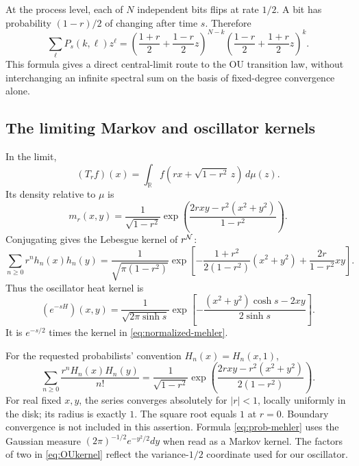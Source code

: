 \documentclass[11pt,reqno]{amsart}
\theoremstyle{remark}\newtheorem{remark}[proposition]{Remark}
\newcommand{\R}{\mathbb R}\newcommand{\F}{\mathcal F}
\begin{document}
At the process level, each of $N$ independent bits flips at rate $1/2$.
A bit has probability $(1-r)/2$ of changing after time $s$. Therefore
\[
 \sum_\ell P_s(k,\ell)z^\ell
 =\left(\frac{1+r}{2}+\frac{1-r}{2}z\right)^{N-k}
  \left(\frac{1-r}{2}+\frac{1+r}{2}z\right)^k.
\]
This formula gives a direct central-limit route to the OU transition
law, without interchanging an infinite spectral sum on the basis of
fixed-degree convergence alone.

\subsection{The limiting Markov and oscillator kernels}
In the limit,
\begin{equation}\label{eq:OUformula}
 (T_rf)(x)=\int_\R f(rx+\sqrt{1-r^2}\,z)\,d\mu(z).
\end{equation}
Its density relative to $\mu$ is
\begin{equation}\label{eq:OUkernel}
 m_r(x,y)=\frac1{\sqrt{1-r^2}}
 \exp\left(\frac{2rxy-r^2(x^2+y^2)}{1-r^2}\right).
\end{equation}
Conjugating gives the Lebesgue kernel of $r^{\mathcal N}$:
\begin{equation}\label{eq:normalized-mehler}
 \sum_{n\ge0}r^nh_n(x)h_n(y)
 =\frac1{\sqrt{\pi(1-r^2)}}
 \exp\left[-\frac{1+r^2}{2(1-r^2)}(x^2+y^2)
            +\frac{2r}{1-r^2}xy\right].
\end{equation}
Thus the oscillator heat kernel is
\begin{equation}\label{eq:heat}
 (e^{-sH})(x,y)=\frac1{\sqrt{2\pi\sinh s}}
 \exp\left[-\frac{(x^2+y^2)\cosh s-2xy}{2\sinh s}\right].
\end{equation}
It is $e^{-s/2}$ times the kernel in \eqref{eq:normalized-mehler}.

For the requested probabilists' convention $H_n(x)=H_n(x,1)$,
\begin{equation}\label{eq:prob-mehler}
 \boxed{\sum_{n\ge0}\frac{r^nH_n(x)H_n(y)}{n!}
 =\frac1{\sqrt{1-r^2}}
 \exp\left(\frac{2rxy-r^2(x^2+y^2)}{2(1-r^2)}\right).}
\end{equation}
For real fixed $x,y$, the series converges absolutely for $|r|<1$,
locally uniformly in the disk; its radius is exactly $1$.
The square root equals $1$ at $r=0$. Boundary convergence is not included
in this assertion. Formula \eqref{eq:prob-mehler} uses the Gaussian
measure $(2\pi)^{-1/2}e^{-y^2/2}dy$ when read as a Markov kernel.
The factors of two in \eqref{eq:OUkernel} reflect the variance-$1/2$
coordinate used for our oscillator.
\end{document}
